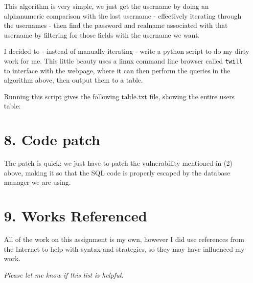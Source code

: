 \documentclass[12pt,letterpaper]{article}
\begin{document}
This algorithm is very simple, we just get the username by doing an alphanumeric
comparison with the last username - effectively iterating through the
usernames - then find the password and realname associated with that
username by filtering for those fields with the username we want.

I decided to - instead of manually iterating - write a python script to do
my dirty work for me. This little beauty uses a linux command line browser
called \verb~twill~ to interface with the webpage, where it can then perform
the queries in the algorithm above, then output them to a table.



Running this script gives the following table.txt file, showing the entire
users table:



\section*{8. Code patch}
The patch is quick: we just have to patch the vulnerability mentioned in
(2) above, making it so that the SQL code is properly escaped by the
database manager we are using.



\section*{9. Works Referenced}
All of the work on this assignment is my own, however I did use references
from the Internet to help with syntax and strategies, so they may have
influenced my work.

\emph{Please let me know if this list is helpful.}
\end{document}
